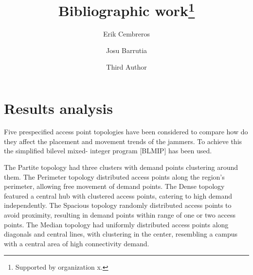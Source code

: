 \documentclass[runningheads]{llncs}
\begin{document}
	\title{Bibliographic work\thanks{Supported by organization x.}}
	\author{Erik Cembreros \and
		Josu Barrutia \and
		Third Author}
	\maketitle              %
	\begin{abstract}
			
		
	\end{abstract}
	
	\clearpage
	\section{Results analysis}
	
	Five prespecified access point topologies have been considered to compare how do they affect the placement and movement trends of the jammers. To achieve this the simplified bilevel mixed-
	integer program [BLMIP] has been used.
	
	The Partite topology had three clusters with demand points clustering around them. The Perimeter topology distributed access points along the region's perimeter, allowing free movement of demand points. The Dense topology featured a central hub with clustered access points, catering to high demand independently. The Spacious topology randomly distributed access points to avoid proximity, resulting in demand points within range of one or two access points. The Median topology had uniformly distributed access points along diagonals and central lines, with clustering in the center, resembling a campus with a central area of high connectivity demand.
	
\end{document}
